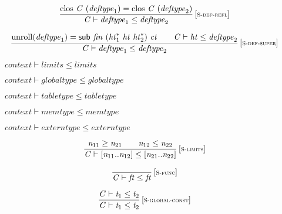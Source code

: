\vspace{1ex}

$$
\begin{array}{@{}c@{}}\displaystyle
\frac{
{\mathrm{clos}}~{\mathit{C}}~({\mathit{deftype}}_{{1}}) = {\mathrm{clos}}~{\mathit{C}}~({\mathit{deftype}}_{{2}})
}{
{\mathit{C}} \vdash {\mathit{deftype}}_{{1}} \leq {\mathit{deftype}}_{{2}}
} \, {[\textsc{\scriptsize S{-}def{-}refl}]}
\qquad
\end{array}
$$

$$
\begin{array}{@{}c@{}}\displaystyle
\frac{
{\mathrm{unroll}}({\mathit{deftype}}_{{1}}) = \mathsf{sub}~{\mathit{fin}}~({{\mathit{ht}}_{{1}}^\ast}~{\mathit{ht}}~{{\mathit{ht}}_{{2}}^\ast})~{\mathit{ct}}
 \qquad
{\mathit{C}} \vdash {\mathit{ht}} \leq {\mathit{deftype}}_{{2}}
}{
{\mathit{C}} \vdash {\mathit{deftype}}_{{1}} \leq {\mathit{deftype}}_{{2}}
} \, {[\textsc{\scriptsize S{-}def{-}super}]}
\qquad
\end{array}
$$

\vspace{1ex}

$\boxed{{\mathit{context}} \vdash {\mathit{limits}} \leq {\mathit{limits}}}$

$\boxed{{\mathit{context}} \vdash {\mathit{globaltype}} \leq {\mathit{globaltype}}}$

$\boxed{{\mathit{context}} \vdash {\mathit{tabletype}} \leq {\mathit{tabletype}}}$

$\boxed{{\mathit{context}} \vdash {\mathit{memtype}} \leq {\mathit{memtype}}}$

$\boxed{{\mathit{context}} \vdash {\mathit{externtype}} \leq {\mathit{externtype}}}$

\vspace{1ex}

$$
\begin{array}{@{}c@{}}\displaystyle
\frac{
{\mathit{n}}_{{11}} \geq {\mathit{n}}_{{21}}
 \qquad
{\mathit{n}}_{{12}} \leq {\mathit{n}}_{{22}}
}{
{\mathit{C}} \vdash [{\mathit{n}}_{{11}} .. {\mathit{n}}_{{12}}] \leq [{\mathit{n}}_{{21}} .. {\mathit{n}}_{{22}}]
} \, {[\textsc{\scriptsize S{-}limits}]}
\qquad
\end{array}
$$

$$
\begin{array}{@{}c@{}}\displaystyle
\frac{
}{
{\mathit{C}} \vdash {\mathit{ft}} \leq {\mathit{ft}}
} \, {[\textsc{\scriptsize S{-}func}]}
\qquad
\end{array}
$$

$$
\begin{array}{@{}c@{}}\displaystyle
\frac{
{\mathit{C}} \vdash {\mathit{t}}_{{1}} \leq {\mathit{t}}_{{2}}
}{
{\mathit{C}} \vdash {\mathit{t}}_{{1}} \leq {\mathit{t}}_{{2}}
} \, {[\textsc{\scriptsize S{-}global{-}const}]}
\qquad
\end{array}
$$

